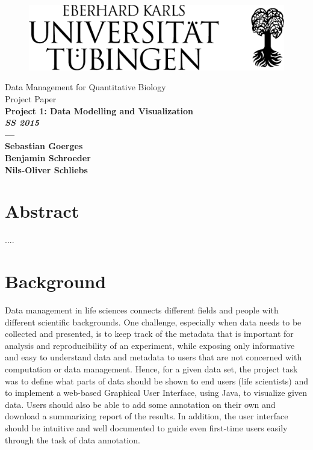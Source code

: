 \documentclass[a4paper, 11pt]{article}
\begin{document}
\begin{titlepage}
    \begin{figure}[htp]
        \centering
        \includegraphics[scale=0.65]{unilogo.pdf}
    \end{figure}

    \begin{center}
        \sc
        \rm
        \vspace{2cm}
        \Huge \mdseries Data Management for Quantitative Biology \\[2.0cm]
        \Huge \mdseries Project Paper \\[2.0cm]
	      \LARGE \bfseries Project 1: Data Modelling and Visualization \\[2cm]
        \large \textit{SS 2015}\\[0.125cm]
        \Huge \bfseries ---\\[0.5cm]
        \Large \mdseries Sebastian Goerges  \\ 
        \Large \mdseries Benjamin Schroeder  \\ 
        \Large \mdseries Nils-Oliver Schliebs  \\
        \large \date{\today}
    \end{center}
\end{titlepage}

\newpage
\section*{Abstract}
....
\section{Background}
Data management in life sciences connects different fields and people with different scientific backgrounds. One challenge, especially when data needs to be collected and presented, is to keep track of the metadata that is important for analysis and reproducibility of an experiment, while exposing only informative and easy to understand data and metadata to users that are not concerned with computation or data management. Hence, for a given data set, the project task was to define what parts of data should be shown to end users (life scientists) and to implement a web-based Graphical User Interface, using Java, to visualize given data. Users should also be able to add some annotation on their own and download a summarizing report of the results. In addition, the user interface should be intuitive and well documented to guide even first-time users easily through the task
of data annotation.
\end{document}
